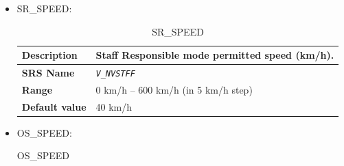 \begin{itemize}
\begin{longtable}{|l|l|}
				\hline

			\end{longtable}


		\item SR\_SPEED:
			\begin{longtable}{|l|l|}
				\caption{SR\_SPEED}\\
				\hline

					\begin{minipage}[t]{0.22\linewidth} \textbf{Description}	\end{minipage}
				&	\begin{minipage}[t]{0.78\linewidth} Staff Responsible mode permitted speed (km/h). \end{minipage} \\

				\hline

					\begin{minipage}[t]{0.22\linewidth} \textbf{SRS Name}	\end{minipage}
				&	\begin{minipage}[t]{0.78\linewidth} \emph{\texttt{V\_NVSTFF}} \end{minipage} \\

				\hline

					\begin{minipage}[t]{0.22\linewidth} \textbf{Range}	\end{minipage}
				&	\begin{minipage}[t]{0.78\linewidth} 0 km/h – 600 km/h (in 5 km/h step) \end{minipage} \\

				\hline

					\begin{minipage}[t]{0.22\linewidth} \textbf{Default value}	\end{minipage}
				&	\begin{minipage}[t]{0.78\linewidth} 40 km/h \end{minipage} \\

				\hline

			\end{longtable}


		\item OS\_SPEED:

			\begin{longtable}{|l|l|}
				\caption{OS\_SPEED}\\
				\hline


\end{longtable}
\end{itemize}
